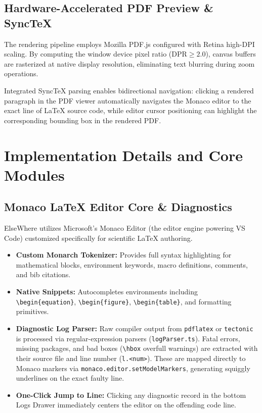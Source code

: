 \documentclass[12pt,a4paper]{article}
\newcommand{\code}[1]{\texttt{#1}}
\begin{document}
\subsection{Hardware-Accelerated PDF Preview \& SyncTeX}
The rendering pipeline employs Mozilla PDF.js configured with Retina high-DPI scaling. By computing the window device pixel ratio ($\mathrm{DPR} \ge 2.0$), canvas buffers are rasterized at native display resolution, eliminating text blurring during zoom operations.

Integrated SyncTeX parsing enables bidirectional navigation: clicking a rendered paragraph in the PDF viewer automatically navigates the Monaco editor to the exact line of \LaTeX{} source code, while editor cursor positioning can highlight the corresponding bounding box in the rendered PDF.

\clearpage
\section{Implementation Details and Core Modules}\label{sec:impl}

\subsection{Monaco \LaTeX{} Editor Core \& Diagnostics}
ElseWhere utilizes Microsoft's Monaco Editor (the editor engine powering VS Code) customized specifically for scientific \LaTeX{} authoring.
\begin{itemize}
    \item \textbf{Custom Monarch Tokenizer:} Provides full syntax highlighting for mathematical blocks, environment keywords, macro definitions, comments, and bib citations.
    \item \textbf{Native Snippets:} Autocompletes environments including \code{\textbackslash begin\{equation\}}, \code{\textbackslash begin\{figure\}}, \code{\textbackslash begin\{table\}}, and formatting primitives.
    \item \textbf{Diagnostic Log Parser:} Raw compiler output from \code{pdflatex} or \code{tectonic} is processed via regular-expression parsers (\code{logParser.ts}). Fatal errors, missing packages, and bad boxes (\code{\textbackslash hbox} overfull warnings) are extracted with their source file and line number (\code{l.<num>}). These are mapped directly to Monaco markers via \code{monaco.editor.setModelMarkers}, generating squiggly underlines on the exact faulty line.
    \item \textbf{One-Click Jump to Line:} Clicking any diagnostic record in the bottom Logs Drawer immediately centers the editor on the offending code line.
\end{itemize}
\end{document}

